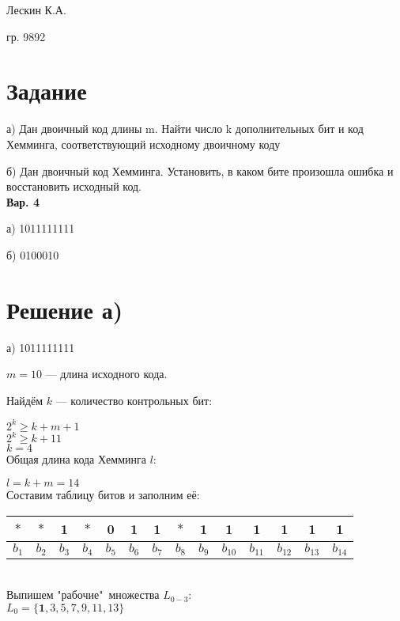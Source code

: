 Лескин К.А.

гр. 9892

\section*{Задание}

а) Дан двоичный код длины m. Найти число k дополнительных бит и код Хемминга, соответствующий исходному двоичному коду

б) Дан двоичный код Хемминга. Установить, в каком бите произошла ошибка и восстановить исходный код.
\\

\textbf{Вар. 4}

а) 1011111111

б) 0100010

\section*{Решение а)}

а) 1011111111

$ m = 10 $ --- длина исходного кода.

Найдём $ k $ --- количество контрольных бит:

$ 2^k \geq k + m + 1 $\\

$ 2^k \geq k + 11 $\\

$ k = 4 $\\

Общая длина кода Хемминга $ l $:

$ l = k + m = 14 $\\

Составим таблицу битов и заполним её:\\

\begin{tabular}{|c|c|c|c|c|c|c|c|c|c|c|c|c|c|}
    \hline
    $ * $ & $ * $ & 1 & $ * $ & 0 & 1 & 1 & $ * $ & 1 & 1 & 1 & 1 & 1 & 1 \\
    \hline
    $ b_{1} $ & $ b_{2} $ & $ b_{3} $ & $ b_{4} $ & $ b_{5} $ & $ b_{6} $ & $ b_{7} $ & $ b_{8} $ & $ b_{9} $ & $ b_{10} $ & $ b_{11} $ & $ b_{12} $ & $ b_{13} $ & $ b_{14} $\\
    \hline
\end{tabular}
\\

Выпишем "рабочие"\ множества $ L_{0-3} $:\\

$ L_0 = \{\textbf{1}, 3, 5, 7, 9, 11, 13\} $\\

